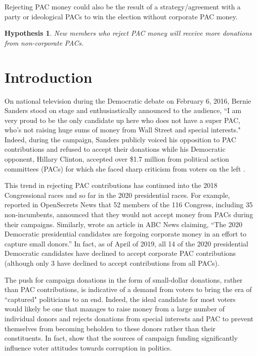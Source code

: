 \documentclass[12pt]{article}
\newtheorem{hyp}{Hypothesis}
\begin{document}
Rejecting PAC money could also be the result of a strategy/agreement with a party or ideological PACs to win the election without corporate PAC money.

\begin{hyp}
	New members who reject PAC money will receive more donations from non-corporate PACs.
\end{hyp}




\section{Introduction} \label{sec: intro}


On national television during the Democratic debate on February 6, 2016, Bernie Sanders stood on stage and enthusiastically announced to the audience, ``I am very proud to be the only candidate up here who does not have a super PAC, who’s not raising huge sums of money from Wall Street and special interests." Indeed, during the campaign, Sanders publicly voiced his opposition to PAC contributions and refused to accept their donations while his Democratic opponent, Hillary Clinton, accepted over \$1.7 million from political action committees (PACs) for which she faced sharp criticism from voters on the left \citep{harper_2020_2019, ye_hee_lee_sanderss_2016, seitz-wald_promise_2015, bump_why_2016}. 

This trend in rejecting PAC contributions has continued into the 2018 Congressional races and so far in the 2020 presidential races. For example, \citet{evers-hillstrom_democrats_2018} reported in OpenSecrets News that 52 members of the 116 Congress, including 35 non-incumbents, announced that they would not accept money from PACs during their campaigns. Similarly,  wrote an article in ABC News claiming, ``The 2020 Democratic presidential candidates are forgoing corporate money in an effort to capture small donors.'' In fact, as of April of 2019, all 14 of the 2020 presidential Democratic candidates have declined to accept corporate PAC contributions (although only 3 have declined to accept contributions from all PACs). 

The push for campaign donations in the form of small-dollar donations, rather than PAC contributions, is indicative of a demand from voters to bring the era of ``captured" politicians to an end. Indeed, the ideal candidate for most voters would likely be one that manages to raise money from a large number of individual donors and rejects donations from special interests and PAC to prevent themselves from becoming beholden to these donors rather than their constituents. In fact, \citet{bowler_campaign_2016} show that the sources of campaign funding significantly influence voter attitudes towards corruption in politics.  
\end{document}
